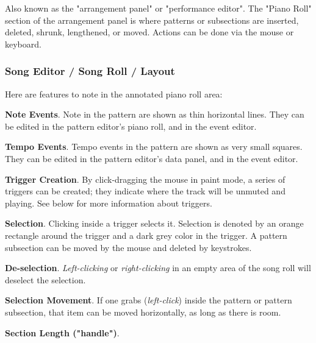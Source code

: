    Also known as the "arrangement panel" or "performance editor".
   The "Piano Roll" section of the arrangement panel is where patterns or
   subsections are inserted, deleted, shrunk, lengthened, or moved.
   Actions can be done via the mouse or keyboard.

\subsubsection{Song Editor / Song Roll / Layout}
\label{subsubsec:song_editor_song_roll_layout}

   Here are features to note in the annotated piano roll area:

   \begin{enumber}
      \item \textbf{Note Events}.
         Note in the pattern are shown as thin horizontal lines.
         They can be edited in the pattern editor's piano roll,
         and in the event editor.
      \item \textbf{Tempo Events}.
         Tempo events in the pattern are shown as very small squares.
         They can be edited in the pattern editor's data panel,
         and in the event editor.
      \item \textbf{Trigger Creation}.
         By click-dragging the mouse in paint mode, a series of triggers can be
         created; they indicate where the track will be unmuted and playing.
         See below for more information about triggers.
      \item \textbf{Selection}.
         Clicking inside a trigger selects it.
         Selection is denoted by an orange rectangle around the trigger
         and a dark grey color in the trigger.
         A pattern subsection can be moved by the mouse and deleted by
         keystrokes.
      \item \textbf{De-selection}.
         \textsl{Left-clicking} or \textsl{right-clicking} in
         an empty area of the song roll
         will deselect the selection.
      \item \textbf{Selection Movement}.
         If one grabs (\textsl{left-click}) inside
         the pattern or pattern subsection, that item can be moved
         horizontally, as long as there is room.
      \item \textbf{Section Length ("handle")}.

\end{enumber}
